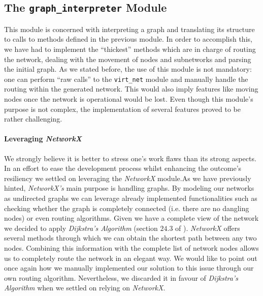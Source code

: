         \subsection{The \texttt{graph\_interpreter} Module}
            This module is concerned with interpreting a graph and translating its structure to calls to methods defined in the previous module. In order to accomplish this, we have had to implement the ``thickest'' methods which are in charge of routing the network, dealing with the movement of nodes and subnetworks and parsing the initial graph. As we stated before, the use of this module is not mandatory: one can perform ``raw calls'' to the \texttt{virt\_net} module and manually handle the routing within the generated network. This would also imply features like moving nodes once the network is operational would be lost. Even though this module's purpose is not complex, the implementation of several features proved to be rather challenging.\\

            \paragraph{Leveraging \textit{NetworkX}}
                We strongly believe it is better to stress one's work flaws than its strong aspects. In an effort to ease the development process whilst enhancing the outcome's resiliency we settled on leveraging the \textit{NetworkX} module.As we have previously hinted, \textit{NetworkX's} main purpose is handling graphs. By modeling our networks as undirected graphs we can leverage already implemented functionalities such as checking whether the graph is completely connected (i.e. there are no dangling nodes) or even routing algorithms. Given we have a complete view of the network we decided to apply \textit{Dijkstra's Algorithm} (section $24.3$ of \cite{bib:dijkstra-alg}). \textit{NetworkX} offers several methods through which we can obtain the shortest path between any two nodes. Combining this information with the complete list of network nodes allows us to completely route the network in an elegant way. We would like to point out once again how we manually implemented our solution to this issue through our own routing algorithm. Nevertheless, we discarded it in favour of \textit{Dijkstra's Algorithm} when we settled on relying on \textit{NetworkX}.\\

            

